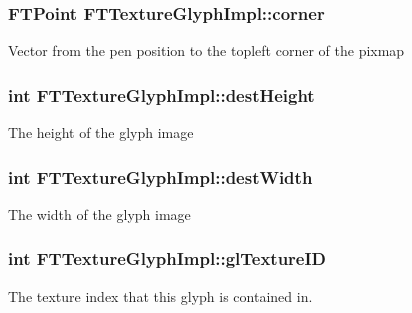 \subsubsection[{\texorpdfstring{corner}{corner}}]{\setlength{\rightskip}{0pt plus 5cm}F\+T\+Point F\+T\+Texture\+Glyph\+Impl\+::corner\hspace{0.3cm}{\ttfamily [private]}}\hypertarget{class_f_t_texture_glyph_impl_a583e049f6d1714438419e7971d4f9250}{}\label{class_f_t_texture_glyph_impl_a583e049f6d1714438419e7971d4f9250}
Vector from the pen position to the topleft corner of the pixmap 
\subsubsection[{\texorpdfstring{dest\+Height}{destHeight}}]{\setlength{\rightskip}{0pt plus 5cm}int F\+T\+Texture\+Glyph\+Impl\+::dest\+Height\hspace{0.3cm}{\ttfamily [private]}}\hypertarget{class_f_t_texture_glyph_impl_ae8112e653f244706c95112d52ea1ce17}{}\label{class_f_t_texture_glyph_impl_ae8112e653f244706c95112d52ea1ce17}
The height of the glyph \textquotesingle{}image\textquotesingle{} 
\subsubsection[{\texorpdfstring{dest\+Width}{destWidth}}]{\setlength{\rightskip}{0pt plus 5cm}int F\+T\+Texture\+Glyph\+Impl\+::dest\+Width\hspace{0.3cm}{\ttfamily [private]}}\hypertarget{class_f_t_texture_glyph_impl_a374ab973a59c0d2615bfa77a2756499e}{}\label{class_f_t_texture_glyph_impl_a374ab973a59c0d2615bfa77a2756499e}
The width of the glyph \textquotesingle{}image\textquotesingle{} 
\subsubsection[{\texorpdfstring{gl\+Texture\+ID}{glTextureID}}]{\setlength{\rightskip}{0pt plus 5cm}int F\+T\+Texture\+Glyph\+Impl\+::gl\+Texture\+ID\hspace{0.3cm}{\ttfamily [private]}}\hypertarget{class_f_t_texture_glyph_impl_a9e7c90deafd55bb19afc9027080c0b29}{}\label{class_f_t_texture_glyph_impl_a9e7c90deafd55bb19afc9027080c0b29}
The texture index that this glyph is contained in. 
